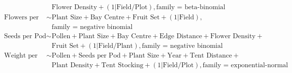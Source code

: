\begin{align*}
    &   \text{Flower Density} + (1|\text{Field/Plot}), \text{family = beta-binomial} \\
    \text{Flowers per Plant} \sim & \text{Plant Size} + \text{Bay Centre} + \text{Fruit Set} + (1|\text{Field}),\\
    &   \text{family = negative binomial} \\
    \text{Seeds per Pod} \sim & \text{Pollen} + \text{Plant Size} + \text{Bay Centre} + \text{Edge Distance} + \text{Flower Density} +\\
    &   \text{Fruit Set} + (1|\text{Field/Plant}), \text{family = negative binomial} \\
    \text{Weight per Seed} \sim & \text{Pollen} + \text{Seeds per Pod} + \text{Plant Size} + \text{Year} + \text{Tent Distance} +\\
    &   \text{Plant Density} + \text{Tent Stocking} + (1|\text{Field/Plot}), \text{family = exponential-normal}
\end{align*}

